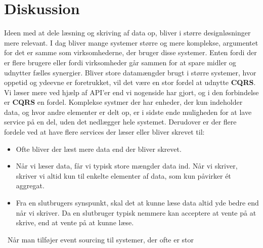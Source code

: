 \chapter{Diskussion}
Ideen med at dele læsning og skriving af data op, bliver i større designløsninger mere relevant. 
I dag bliver mange systemer større og mere komplekse, argumentet for det er samme som virksomhederne, der bruger disse systemer. Enten fordi der er flere brugere eller fordi virksomheder går sammen for at spare midler og udnytter fælles synergier.
Bliver store datamængder brugt i større systemer, hvor oppetid og ydeevne er foretrukket, vil det være en stor fordel at udnytte \textbf{CQRS}. 
Vi læser mere ved hjælp af API'er end vi nogenside har gjort, og i den forbindelse er \textbf{CQRS} en fordel. Komplekse systmer der har enheder, der kun indeholder data, og hvor andre elementer er delt op, er i sidste ende muligheden for at lave service på en del, uden det nedlægger hele systemet. 
Derudover er der flere fordele ved at have flere services der læser eller bliver skrevet til:\
\begin{itemize}
    \item Ofte bliver der læst mere data end der bliver skrevet.
    \item Når vi læser data, får vi typisk store mængder data ind. Når vi skriver, skriver vi altid kun til enkelte elementer af data, som kun påvirker ét aggregat.
    \item Fra en slutbrugers synspunkt, skal det at kunne læse data altid yde bedre end når vi skriver. Da en slutbruger typisk nemmere kan acceptere at vente på at skrive, end at vente på at kunne læse.
\end{itemize}
\
Når man tilføjer event sourcing til systemer, der ofte er stor

